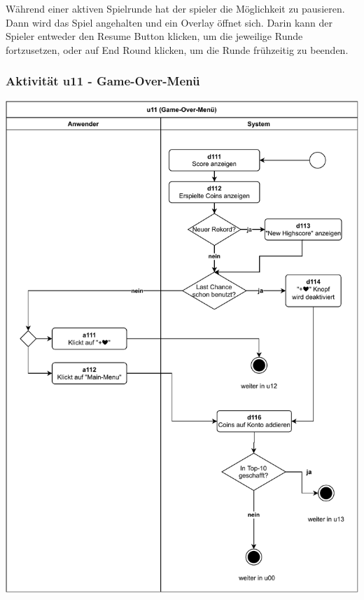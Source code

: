 Während einer aktiven Spielrunde hat der \gls{spieler} die Möglichkeit zu pausieren. Dann wird das Spiel angehalten und ein Overlay öffnet sich. Darin kann der Spieler entweder den Resume Button klicken, um die jeweilige Runde fortzusetzen, oder auf End Round klicken, um die Runde frühzeitig zu beenden.

\clearpage

\subsubsection{Aktivität u11 - Game-Over-Menü}

\vspace*{1cm}

\includegraphics[width=\linewidth]{diagramme/pdf/UML-Activity-u11.pdf}
\label{fig:dia:gameOver}
\vspace*{0.5cm}


